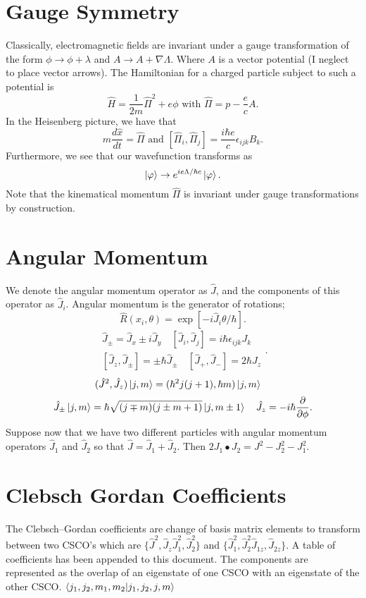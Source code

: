 \documentclass{article}
\begin{document}
  \section*{Gauge Symmetry}
    Classically, electromagnetic fields are invariant under a gauge transformation
    of the form $\phi \rightarrow \phi + \lambda$ and  $A \rightarrow A + \nabla \Lambda$. 
    Where $A$ is a vector potential (I neglect to place vector arrows). 
    The Hamiltonian for a charged particle subject to such a potential is 
     \[
       \hat H = \frac{1}{2m} \hat \Pi^2 + e \phi \text{ with } \hat\Pi = p - \frac{e}{c}A
    .\] 
    In the Heisenberg picture, we have that \[
      m \frac{d\hat{x}}{d t} = \hat{\Pi} \text{ and } [\hat{\Pi}_i,\hat{\Pi}_j] = 
      \frac{i \hbar e}{c }\epsilon_{ijk} B_k
    .\] 
    Furthermore, we see that our wavefunction transforms as \[
      \ket{\varphi} \rightarrow e^{i e \Lambda / \hbar c}\ket{\varphi}
    .\] 
    Note that the kinematical momentum $\hat \Pi $ is invariant under gauge
    transformations by construction. 

  \section*{Angular Momentum}
    We denote the angular momentum operator as $\hat J$, and the components of this
    operator as  $\hat J _i $.
    Angular momentum is the generator of rotations; 
    \[
      \hat{R}(x_i,\theta) = \exp[- i \hat J _i \theta / \hbar]
    .\] 
    \[
      \begin{split}
      \hat{J}_\pm = \hat{J}_x \pm i \hat{J}_y \quad
      [\hat J _i, \hat J _j] = i \hbar \epsilon_{ijk} J_k \quad \\
      [\hat J _z, \hat{J}_\pm] = \pm \hbar \hat{J}_\pm \quad
      [\hat J _+, \hat J _-] = 2\hbar J_z
    \end{split}
    .\]\[
    (\hat{J}^2, \hat{J}_z)\ket{j,m} = (\hbar^2j(j+1),\hbar m)\ket{j,m} \quad
    \]\[
		\hat{J}_{\pm} \ket{j,m} = \hbar \sqrt{(j\mp m)(j \pm m + 1)}\ket{j,m\pm 1}
		\quad \hat{J}_z = -i\hbar\frac{\partial}{\partial \phi}
    .\]   
    Suppose now that we have two different particles with angular momentum 
    operators $\hat J _1$ and $\hat J _2$ so that  $\hat J = \hat J _1 +\hat J_2$.
    Then  $2 J_1 \bullet J_2 = J^2 - J_2^2 - J_1^2$.

    \section*{Clebsch Gordan Coefficients}
      The Clebsch--Gordan coefficients are change of basis matrix elements 
      to transform between two CSCO's which are 
      $\{\hat J ^2, \hat J _z \hat J _1 ^2 , \hat J _2 ^2\}$ and 
      $\{\hat J _1^2 , \hat J _2^2 \hat J _{1z} , \hat J _{2z} \}$.
      A table of coefficients has been appended to this document. 
      The components are represented as the overlap of an eigenstate of one 
      CSCO with an eigenstate of the other CSCO. $\bra{j_1,j_2,m_1,m_2}\ket{j_1,j_2,j,m}$
\end{document}
